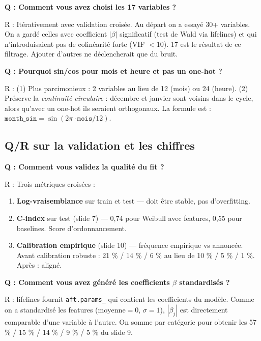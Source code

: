 \documentclass[11pt,a4paper]{article}
\begin{document}
\begin{piege}
\textbf{Q : Comment vous avez choisi les 17 variables ?}

R : Itérativement avec validation croisée. Au départ on a essayé 30+ variables. On a
gardé celles avec coefficient $|\beta|$ significatif (test de Wald via lifelines) et
qui n'introduisaient pas de colinéarité forte (VIF $< 10$). 17 est le résultat de ce
filtrage. Ajouter d'autres ne déclencherait que du bruit.
\end{piege}

\begin{piege}
\textbf{Q : Pourquoi sin/cos pour mois et heure et pas un one-hot ?}

R : (1) Plus parcimonieux : 2 variables au lieu de 12 (mois) ou 24 (heure). (2) Préserve
la \emph{continuité circulaire} : décembre et janvier sont voisins dans le cycle, alors
qu'avec un one-hot ils seraient orthogonaux. La formule est :
$\texttt{month\_sin} = \sin(2\pi \cdot \texttt{mois} / 12)$.
\end{piege}

\subsection*{Q/R sur la validation et les chiffres}

\begin{piege}
\textbf{Q : Comment vous validez la qualité du fit ?}

R : Trois métriques croisées :
\begin{enumerate}[topsep=2pt]
    \item \textbf{Log-vraisemblance} sur train et test — doit être stable, pas
    d'overfitting.
    \item \textbf{C-index} sur test (slide 7) — 0,74 pour Weibull avec features,
    0,55 pour baselines. Score d'ordonnancement.
    \item \textbf{Calibration empirique} (slide 10) — fréquence empirique vs annoncée.
    Avant calibration robuste : 21 \% / 14 \% / 6 \% au lieu de 10 \% / 5 \% / 1 \%.
    Après : aligné.
\end{enumerate}
\end{piege}

\begin{piege}
\textbf{Q : Comment vous avez généré les coefficients $\beta$ standardisés ?}

R : lifelines fournit \texttt{aft.params\_} qui contient les coefficients du modèle.
Comme on a standardisé les features ($\text{moyenne}=0$, $\sigma=1$), $|\beta_j|$ est
directement comparable d'une variable à l'autre. On somme par catégorie pour obtenir
les 57 \% / 15 \% / 14 \% / 9 \% / 5 \% du slide 9.
\end{piege}
\end{document}
